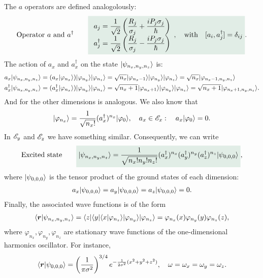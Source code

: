 The $a$ operators are defined analogolously:
\begin{align}
    \text{Operator $a$ and $a^\dagger$}\qquad\highlight{
        \begin{array}{l}a_j=\dfrac{1}{\sqrt{2}}\left(\dfrac{R_j}{\sigma_j}+\dfrac{iP_j\sigma_j}{\hbar}\right)\\
            a^\dagger_j=\dfrac{1}{\sqrt{2}}\left(\dfrac{R_j}{\sigma_j}-\dfrac{iP_j\sigma_j}{\hbar}\right)
        \end{array},\quad\text{with}\quad[a_i,a^\dagger_j]=\delta_{ij}}.
\end{align}
The action of $a_x$ and $a_x^\dagger$ on the state $|\psi_{n_x,n_y,n_z}\rangle$ is:
\begin{align}
    a_x|\psi_{n_x,n_y,n_z}\rangle&=(a_x|\varphi_{n_x}\rangle)|\varphi_{n_y}\rangle|\varphi_{n_z}\rangle=\sqrt{n_x}|\varphi_{n_x-1}\rangle|\varphi_{n_y}\rangle|\varphi_{n_z}\rangle=\sqrt{n_x}|\varphi_{n_x-1,n_y,n_z}\rangle\\
    a_x^\dagger|\psi_{n_x,n_y,n_z}\rangle&=(a_x^\dagger|\varphi_{n_x}\rangle)|\varphi_{n_y}\rangle|\varphi_{n_z}\rangle=\sqrt{n_x+1}|\varphi_{n_x+1}\rangle|\varphi_{n_y}\rangle|\varphi_{n_z}\rangle=\sqrt{n_x+1}|\varphi_{n_x+1,n_y,n_z}\rangle.
\end{align}
And for the other dimensions is analogous. We also know that 
\begin{align*}
    |\varphi_{n_x}\rangle=\frac{1}{\sqrt{n_x!}}(a_x^\dagger)^{n_x}|\varphi_0\rangle,\quad a_x\in\mathscr{E}_x:\quad a_x|\varphi_0\rangle=0.
\end{align*}
In $\mathscr{E}_y$ and $\mathscr{E}_z$ we have something similar. Consequently, we can write 
\begin{align}
    \text{Excited state}\qquad\highlight{\ket{\psi_{n_x,n_y,n_z}}=\frac{1}{\sqrt{n_x!n_y!n_z!}}(a_x^\dagger)^{n_x}(a_y^\dagger)^{n_y}(a_z^\dagger)^{n_z}\ket{\psi_{0,0,0}}},
\end{align}
where $|\psi_{0,0,0}\rangle$ is the tensor product of the ground states of each dimension:
\begin{align*}
    a_x|\psi_{0,0,0}\rangle=a_y|\psi_{0,0,0}\rangle=a_z|\psi_{0,0,0}\rangle=0.
\end{align*}
Finally, the associated wave functions is of the form 
\begin{align}
    \langle\bm{r}|\psi_{n_x,n_y,n_z}\rangle=\langle z|\langle y|\langle x|\varphi_{n_z}\rangle|\varphi_{n_y}\rangle|\varphi_{n_z}\rangle=\varphi_{n_x}(x)\varphi_{n_y}(y)\varphi_{n_z}(z),
\end{align}
where $\varphi_{n_x},\varphi_{n_y},\varphi_{n_z}$ are stationary wave functions of the one-dimensional harmonics oscillator.
For instance,
\begin{align}
    \langle\bm{r}|\psi_{0,0,0}\rangle=\left(\frac{1}{\pi\sigma^2}\right)^{3/4}e^{-\frac{1}{2\sigma^2}(x^2+y^2+z^2)},\quad\omega=\omega_x=\omega_y=\omega_z.
\end{align}
%
